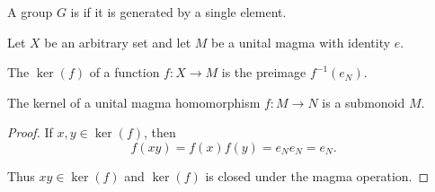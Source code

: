 \begin{definition}\label{def:cyclic_group}
  A group \( G \) is  if it is generated by a single element.
\end{definition}

\begin{definition}\label{def:unital_magma_kernel}
  Let \( X \) be an arbitrary set and let \( M \) be a unital magma with identity \( e \).

  The  \( \ker(f) \) of a function \( f: X \to M \) is the preimage \( f^{-1}(e_N) \).
\end{definition}

\begin{proposition}\label{thm:unital_magma_kernel_is_submonoid}
  The kernel of a unital magma homomorphism \( f: M \to N \) is a submonoid \( M \).
\end{proposition}
\begin{proof}
  If \( x, y \in \ker(f) \), then
  \begin{equation*}
    f(xy) = f(x) f(y) = e_N e_N = e_N.
  \end{equation*}

  Thus \( xy \in \ker(f) \) and \( \ker(f) \) is closed under the magma operation.
\end{proof}

